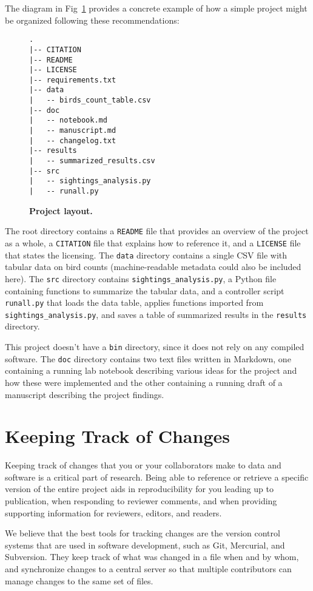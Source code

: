 \documentclass[10pt,letterpaper]{article}
\newcommand{\practicesection}[2]{\section{#1}\label{#2}}
\begin{document}
The diagram in Fig~\ref{fig:project} provides a concrete example of
how a simple project might be organized following these
recommendations:

\begin{figure}
{\small
\begin{verbatim}
.
|-- CITATION
|-- README
|-- LICENSE
|-- requirements.txt
|-- data
|   -- birds_count_table.csv
|-- doc
|   -- notebook.md
|   -- manuscript.md
|   -- changelog.txt
|-- results
|   -- summarized_results.csv
|-- src
|   -- sightings_analysis.py
|   -- runall.py
\end{verbatim}
}
\caption{\textbf{Project layout.}}
\label{fig:project}
\end{figure}

The root directory contains a \texttt{README} file that provides an
overview of the project as a whole, a \texttt{CITATION} file that
explains how to reference it, and a \texttt{LICENSE} file that states the
licensing. The \texttt{data} directory contains a
single CSV file with tabular data on bird counts (machine-readable
metadata could also be included here). The \texttt{src} directory
contains \texttt{sightings\_analysis.py}, a Python file containing
functions to summarize the tabular data, and a controller script
\texttt{runall.py} that loads the data table, applies functions
imported from \texttt{sightings\_analysis.py}, and saves a table of
summarized results in the \texttt{results} directory.

This project doesn't have a \texttt{bin} directory, since it does not
rely on any compiled software. The \texttt{doc} directory contains two
text files written in Markdown, one containing a running lab notebook
describing various ideas for the project and how these were
implemented and the other containing a running draft of a manuscript
describing the project findings.

\practicesection{Keeping Track of Changes}{sec:versioning}

Keeping track of changes that you or your collaborators make to data
and software is a critical part of research. Being able to reference or
retrieve a specific version of the entire project aids in reproducibility
for you leading up to publication, when responding to reviewer comments,
and when providing supporting information for reviewers, editors,
and readers.

We believe that the best tools for tracking changes are the version
control systems that are used in software development, such as Git,
Mercurial, and Subversion. They keep track of what was changed in a
file when and by whom, and synchronize changes to a central server so
that multiple contributors can manage changes to the same set of files.
\end{document}
